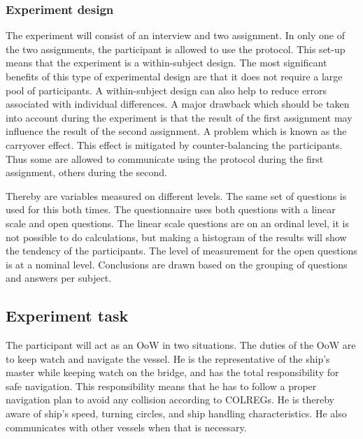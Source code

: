 \subsubsection{Experiment design}
The experiment will consist of an interview and two assignment. In only one of the two assignments, the participant is allowed to use the protocol. This set-up means that the experiment is a within-subject design. The most significant benefits of this type of experimental design are that it does not require a large pool of participants. A within-subject design can also help to reduce errors associated with individual differences. A major drawback which should be taken into account during the experiment is that the result of the first assignment may influence the result of the second assignment. A problem which is known as the carryover effect. This effect is mitigated by counter-balancing the participants. Thus some are allowed to communicate using the protocol during the first assignment, others during the second.

Thereby are variables measured on different levels. The same set of questions is used for this both times. The questionnaire uses both questions with a linear scale and open questions. The linear scale questions are on an ordinal level, it is not possible to do calculations, but making a histogram of the results will show the tendency of the participants. The level of measurement for the open questions is at a nominal level. Conclusions are drawn based on the grouping of questions and answers per subject. 

\subsection{Experiment task}
\label{ssec:experiment-task}
The participant will act as an \acf{OoW} in two situations. The duties of the \ac{OoW} are to keep watch and navigate the vessel. He is the representative of the ship’s master while keeping watch on the bridge, and has the total responsibility for safe navigation. This responsibility means that he has to follow a proper navigation plan to avoid any collision according to COLREGs. He is thereby aware of ship’s speed, turning circles, and ship handling characteristics. He also communicates with other vessels when that is necessary.

